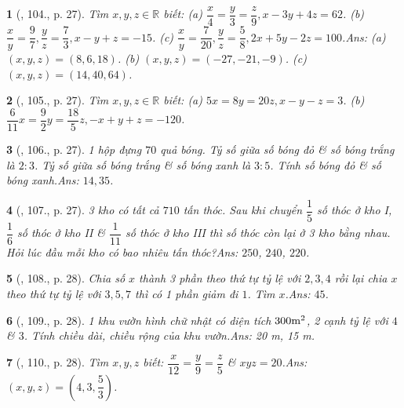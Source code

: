 \documentclass{article}
\newtheorem{baitoan}{}
\begin{document}
\begin{baitoan}[\cite{Tuyen_Toan_7}, 104., p. 27]
	Tìm $x,y,z\in\mathbb{R}$ biết: (a) $\dfrac{x}{4} = \dfrac{y}{3} = \dfrac{z}{9},x - 3y + 4z = 62$. (b) $\dfrac{x}{y} = \dfrac{9}{7},\dfrac{y}{z} = \dfrac{7}{3},x - y + z = -15$. (c) $\dfrac{x}{y} = \dfrac{7}{20},\dfrac{y}{z} = \dfrac{5}{8},2x + 5y - 2z = 100$.\hfill{\sf Ans:} (a) $(x,y,z) = (8,6,18)$. (b) $(x,y,z) = (-27,-21,-9)$. (c) $(x,y,z) = (14,40,64)$.
\end{baitoan}

\begin{baitoan}[\cite{Tuyen_Toan_7}, 105., p. 27]
	Tìm $x,y,z\in\mathbb{R}$ biết: (a) $5x = 8y = 20z,x - y - z = 3$. (b) $\dfrac{6}{11}x = \dfrac{9}{2}y = \dfrac{18}{5}z,-x + y + z = -120$.
\end{baitoan}

\begin{baitoan}[\cite{Tuyen_Toan_7}, 106., p. 27]
	1 hộp đựng $70$ quả bóng. Tỷ số giữa số bóng đỏ \& số bóng trắng là $2:3$. Tỷ số giữa số bóng trắng \& số bóng xanh là $3:5$. Tính số bóng đỏ \& số bóng xanh.\hfill{\sf Ans:} $14,35$.
\end{baitoan}

\begin{baitoan}[\cite{Tuyen_Toan_7}, 107., p. 27]
	3 kho có tất cả $710$ tấn thóc. Sau khi chuyển $\dfrac{1}{5}$ số thóc ở kho I, $\dfrac{1}{6}$ số thóc ở kho II \& $\dfrac{1}{11}$ số thóc ở kho III thì số thóc còn lại ở 3 kho bằng nhau. Hỏi lúc đầu mỗi kho có bao nhiêu tấn thóc?\hfill{\sf Ans:} $250$, $240$, $220$.
\end{baitoan}

\begin{baitoan}[\cite{Tuyen_Toan_7}, 108., p. 28]
	Chia số $x$ thành 3 phần theo thứ tự tỷ lệ với $2,3,4$ rồi lại chia $x$ theo thứ tự tỷ lệ với $3,5,7$ thì có 1 phần giảm đi $1$. Tìm $x$.\hfill{\sf Ans:} $45$.
\end{baitoan}

\begin{baitoan}[\cite{Tuyen_Toan_7}, 109., p. 28]
	1 khu vườn hình chữ nhật có diện tích $\rm300m^2$, 2 cạnh tỷ lệ với $4$ \& $3$. Tính chiều dài, chiều rộng của khu vườn.\hfill{\sf Ans:} {\rm20 m, 15 m}.
\end{baitoan}

\begin{baitoan}[\cite{Tuyen_Toan_7}, 110., p. 28]
	Tìm $x,y,z$ biết: $\dfrac{x}{12} = \dfrac{y}{9} = \dfrac{z}{5}$ \& $xyz = 20$.\hfill{\sf Ans:} $(x,y,z) = \left(4,3,\dfrac{5}{3}\right)$.
\end{baitoan}
\end{document}
